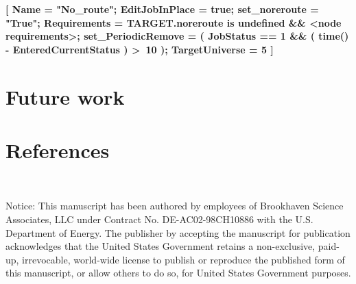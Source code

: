\documentclass[a4paper]{jpconf}
\begin{document}
\begin{center}
    \colorbox{htcondorbox}{
        \begin{minipage}{\textwidth}
        \small
            \bf{[
                 Name = "No\_route";  \newline
                 EditJobInPlace = true; \newline
                 set\_noreroute = "True"; \newline
                 Requirements = TARGET.noreroute is undefined \&\& \textless node requirements\textgreater;  \newline
                 set\_PeriodicRemove = ( JobStatus == 1 \&\& ( time() - EnteredCurrentStatus ) \textgreater \ 10 ); \newline
                 TargetUniverse = 5 \newline
                 ]
            }
        \end{minipage}
    }
\end{center}

\section{Future work}




\section*{References}{}




~

Notice:
This manuscript has been authored by employees of Brookhaven Science Associates,
LLC under Contract No. DE-AC02-98CH10886 with the U.S. Department of Energy.
The publisher by accepting the manuscript for publication acknowledges
that the United States Government retains a non-exclusive, paid-up, irrevocable,
world-wide license to publish or reproduce the published form of this manuscript,
or allow others to do so, for United States Government purposes.
\end{document}
